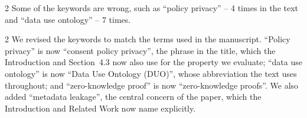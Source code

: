 \begin{reviewcomment}{2}
	Some of the keywords are wrong, such as ``policy privacy'' -- 4 times in the text and ``data use ontology'' -- 7 times.
\end{reviewcomment}

\begin{reviewresponse}{2}
	We revised the keywords to match the terms used in the manuscript.
	``Policy privacy'' is now ``consent policy privacy'', the phrase in the title, which the Introduction and Section~4.3 now also use for the property we evaluate; ``data use ontology'' is now ``Data Use Ontology (DUO)'', whose abbreviation the text uses throughout; and ``zero-knowledge proof'' is now ``zero-knowledge proofs''.
	We also added ``metadata leakage'', the central concern of the paper, which the Introduction and Related Work now name explicitly.

\end{reviewresponse}
